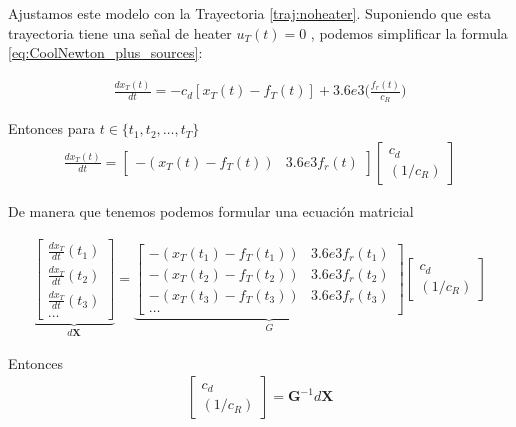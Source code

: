     
    
    Ajustamos este modelo con la Trayectoria \ref{traj:noheater}. Suponiendo que esta trayectoria tiene una señal de heater $u_T(t) = 0$ , podemos simplificar la formula \eqref{eq:CoolNewton_plus_sources}:
    
    \begin{gather}
        \frac{dx_{T}(t)}{dt} = -c_d[x_{T}(t) - f_{T}(t)] + 
        3.6e3     \Bigg( \frac{f_{r}(t)}{ c_R } \Bigg)  
    \end{gather}
     
    Entonces para $t \in \{t_1,t_2,\dots,t_T\}$
    \begin{gather}
    \frac{dx_{T}(t)}{dt} = \begin{bmatrix}
        -(x_T(t) - f_T(t)) & 3.6e3 f_r(t) 
    \end{bmatrix} \begin{bmatrix}
        c_d \\ (1/c_R)
    \end{bmatrix}
    \end{gather}
    
    
    De manera que tenemos podemos formular una ecuación matricial
    
    \begin{gather}
        \underbrace{
        \begin{bmatrix}
            \frac{dx_{T}}{dt}(t_1) \\
            \frac{dx_{T}}{dt}(t_2) \\
            \frac{dx_{T}}{dt}(t_3) \\
            \dots
        \end{bmatrix}}_{d\bm{X}} = 
        \underbrace{\begin{bmatrix}
            -(x_T(t_1) - f_T(t_1)) & 3.6e3 f_r(t_1)  \\
            -(x_T(t_2) - f_T(t_2)) & 3.6e3 f_r(t_2)  \\
            -(x_T(t_3) - f_T(t_3)) & 3.6e3 f_r(t_3)  \\
            \dots
        \end{bmatrix}}_{G} \begin{bmatrix}
            c_d \\ (1/c_R)
        \end{bmatrix}
        \end{gather}
    
    Entonces 
    \begin{gather}
        \begin{bmatrix}
            c_d \\ (1/c_R)
        \end{bmatrix} =  \bm{G}^{-1}d\bm{X}
    \end{gather}
    
